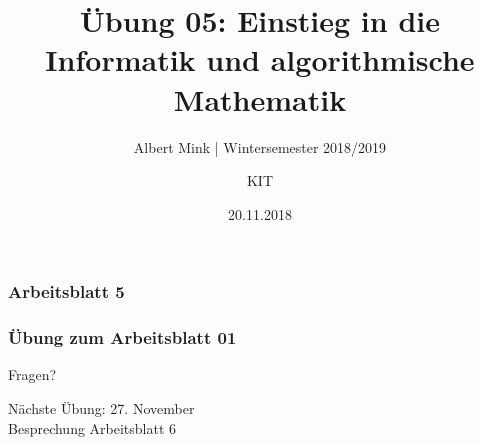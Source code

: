 \documentclass[c,18pt]{beamer}
\date{20.11.2018}
\title[Übung 05: Einstieg in die Informatik und algorithmische Mathematik]
  {Übung 05: Einstieg in die Informatik und algorithmische Mathematik}
\subtitle{Albert Mink | Wintersemester 2018/2019}
\author[Albert Mink, ]{KIT}
\institute[Institut für Angewandte und Numerische Mathematik (IANM)]{Institut für Angewandte und Numerische Mathematik}
\begin{document}
\begin{frame}
  \maketitle
\end{frame}


\begin{frame}
  \frametitle{Arbeitsblatt 5}%
\tableofcontents
\end{frame}
\setcounter{exercise}{20}

\begin{frame}
  \frametitle{Übung zum Arbeitsblatt 01}%
\tableofcontents[hideallsubsections]
\end{frame}

\def\kap{1}%
\setcounter{exercise}{17}
\setcounter{exercise}{18}
\setcounter{exercise}{19}

\begin{frame}
\centering
\Huge\textcolor{KITgreen}{Fragen?}
\vspace{2cm}

{\LARGE
N\"achste \"Ubung: 27. November\\
Besprechung Arbeitsblatt 6
}
\end{frame}


\end{document}
